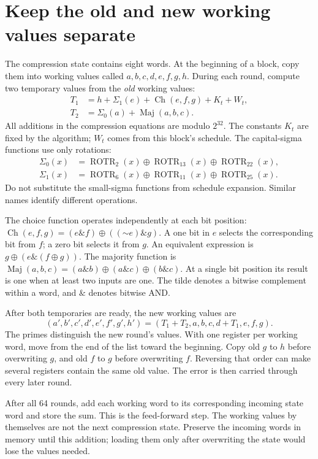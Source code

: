 \section{Keep the old and new working values separate}
The compression state contains eight words. At the beginning of a block, copy them
into working values called \(a,b,c,d,e,f,g,h\). During each round, compute two
temporary values from the \emph{old} working values:
\[
  \begin{aligned}
    T_1 & =h+\Sigma_1(e)+\operatorname{Ch}(e,f,g)+K_t+W_t, \\
    T_2 & =\Sigma_0(a)+\operatorname{Maj}(a,b,c).
  \end{aligned}
\]
All additions in the compression equations are modulo \(2^{32}\). The constants
\(K_t\) are fixed by the algorithm; \(W_t\) comes from this block's schedule.
The capital-sigma functions use only rotations:
\[
  \begin{aligned}
    \Sigma_0(x) & =\operatorname{ROTR}_2(x)\oplus\operatorname{ROTR}_{13}(x)
    \oplus\operatorname{ROTR}_{22}(x),                                       \\
    \Sigma_1(x) & =\operatorname{ROTR}_6(x)\oplus\operatorname{ROTR}_{11}(x)
    \oplus\operatorname{ROTR}_{25}(x).
  \end{aligned}
\]
Do not substitute the small-sigma functions from schedule expansion. Similar names
identify different operations.

The choice function operates independently at each bit position:
\(\operatorname{Ch}(e,f,g)=(e\mathbin{\&}f)\oplus((\mathord{\sim}e)\mathbin{\&}g)\).
A one bit in \(e\) selects the corresponding bit from \(f\); a zero bit selects it
from \(g\). An equivalent expression is \(g\oplus(e\mathbin{\&}(f\oplus g))\).
The majority function is
\(\operatorname{Maj}(a,b,c)=(a\mathbin{\&}b)\oplus(a\mathbin{\&}c)\oplus(b\mathbin{\&}c)\).
At a single bit position its result is one when at least two inputs are one.
The tilde denotes a bitwise complement within a word, and \(\&\) denotes bitwise AND.

After both temporaries are ready, the new working values are
\[
  (a',b',c',d',e',f',g',h')=
  (T_1+T_2,a,b,c,d+T_1,e,f,g).
\]
The primes distinguish the new round's values. With one register per working word,
move from the end of the list toward the beginning. Copy old \(g\) to \(h\) before
overwriting \(g\), and old \(f\) to \(g\) before overwriting \(f\). Reversing that
order can make several registers contain the same old value. The error is then carried
through every later round.

After all 64 rounds, add each working word to its corresponding incoming state word
and store the sum. This is the feed-forward step. The working values by themselves
are not the next compression state. Preserve the incoming words in memory until this
addition; loading them only after overwriting the state would lose the values needed.
